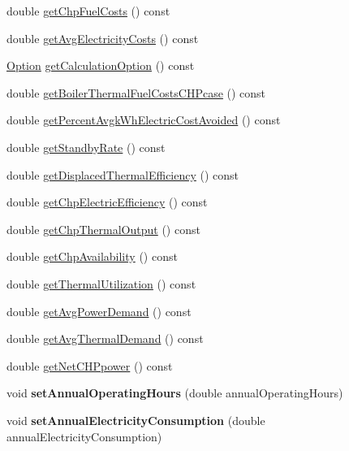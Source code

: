 \begin{DoxyCompactItemize}
\item 
double \hyperlink{class_c_h_p_a00929ba5d10367258dc1dc437eda88e3}{get\+Chp\+Fuel\+Costs} () const
\item 
double \hyperlink{class_c_h_p_a2bc5ac0eb3d7ce42f77f26b3973f6c9f}{get\+Avg\+Electricity\+Costs} () const
\item 
\hyperlink{class_c_h_p_ac82f530412021ace928a7e95c1295d06}{Option} \hyperlink{class_c_h_p_a858f0201818f637331e0d06d3171bee7}{get\+Calculation\+Option} () const
\item 
double \hyperlink{class_c_h_p_ace1d96aacf328bd62f01e0eceaae19f6}{get\+Boiler\+Thermal\+Fuel\+Costs\+C\+H\+Pcase} () const
\item 
double \hyperlink{class_c_h_p_ad79607b304d1e50a9421de043b7a9e7b}{get\+Percent\+Avgk\+Wh\+Electric\+Cost\+Avoided} () const
\item 
double \hyperlink{class_c_h_p_a195f0ffe163404077b56a5e5db8eb59c}{get\+Standby\+Rate} () const
\item 
double \hyperlink{class_c_h_p_a66b1b0e6a0d7f3181b3c1dfb590ab523}{get\+Displaced\+Thermal\+Efficiency} () const
\item 
double \hyperlink{class_c_h_p_a1d38e08a7815211361d334263832cad6}{get\+Chp\+Electric\+Efficiency} () const
\item 
double \hyperlink{class_c_h_p_a13e271f59d6315088416123c6e794e09}{get\+Chp\+Thermal\+Output} () const
\item 
double \hyperlink{class_c_h_p_abd1ea13cd48f5af48799891a52634340}{get\+Chp\+Availability} () const
\item 
double \hyperlink{class_c_h_p_aa27fd9e66e208e6b3f28fdfe182d6c32}{get\+Thermal\+Utilization} () const
\item 
double \hyperlink{class_c_h_p_a79f9a97a010669c5ffed9339c54a36c6}{get\+Avg\+Power\+Demand} () const
\item 
double \hyperlink{class_c_h_p_a5f8975488324e4aa3517c9e01334f4bf}{get\+Avg\+Thermal\+Demand} () const
\item 
double \hyperlink{class_c_h_p_a317f3df613b61f401bc5c4b69fddd0cf}{get\+Net\+C\+H\+Ppower} () const
\item 
\mbox{\label{class_c_h_p_a1b9d3ba01f7e243bcde31bd5fdff9e0a}} 
void {\bfseries set\+Annual\+Operating\+Hours} (double annual\+Operating\+Hours)
\item 
\mbox{\label{class_c_h_p_a306aa3de555bb7dbd79e7aeb1658713e}} 
void {\bfseries set\+Annual\+Electricity\+Consumption} (double annual\+Electricity\+Consumption)

\end{DoxyCompactItemize}
